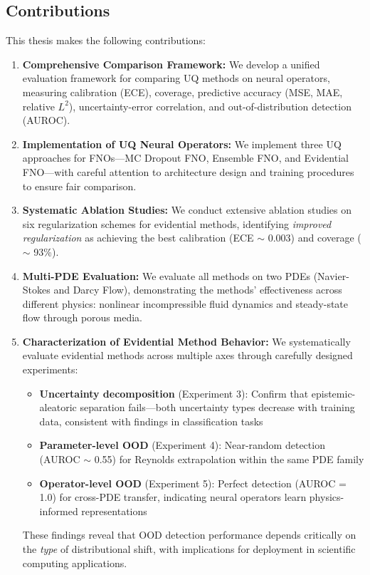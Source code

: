 \subsection{Contributions}

This thesis makes the following contributions:

\begin{enumerate}
    \item \textbf{Comprehensive Comparison Framework:} We develop a unified evaluation framework for comparing UQ methods on neural operators, measuring calibration (ECE), coverage, predictive accuracy (MSE, MAE, relative $L^2$), uncertainty-error correlation, and out-of-distribution detection (AUROC).

    \item \textbf{Implementation of UQ Neural Operators:} We implement three UQ approaches for FNOs—MC Dropout FNO, Ensemble FNO, and Evidential FNO—with careful attention to architecture design and training procedures to ensure fair comparison.

    \item \textbf{Systematic Ablation Studies:} We conduct extensive ablation studies on six regularization schemes for evidential methods, identifying \emph{improved regularization} as achieving the best calibration (ECE $\sim$ 0.003) and coverage ($\sim$ 93\%).

    \item \textbf{Multi-PDE Evaluation:} We evaluate all methods on two PDEs (Navier-Stokes and Darcy Flow), demonstrating the methods' effectiveness across different physics: nonlinear incompressible fluid dynamics and steady-state flow through porous media.

    \item \textbf{Characterization of Evidential Method Behavior:} We systematically evaluate evidential methods across multiple axes through carefully designed experiments:
    \begin{itemize}
        \item \textbf{Uncertainty decomposition} (Experiment 3): Confirm that epistemic-aleatoric separation fails—both uncertainty types decrease with training data, consistent with findings in classification tasks
        \item \textbf{Parameter-level OOD} (Experiment 4): Near-random detection (AUROC $\sim$ 0.55) for Reynolds extrapolation within the same PDE family
        \item \textbf{Operator-level OOD} (Experiment 5): Perfect detection (AUROC = 1.0) for cross-PDE transfer, indicating neural operators learn physics-informed representations
    \end{itemize}
    These findings reveal that OOD detection performance depends critically on the \emph{type} of distributional shift, with implications for deployment in scientific computing applications.


\end{enumerate}
